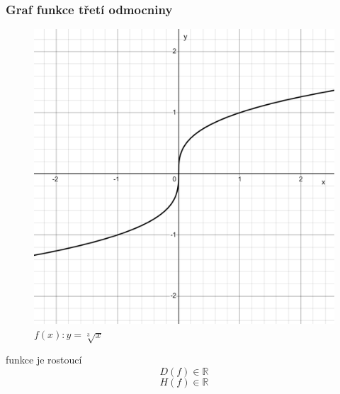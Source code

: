 \subsubsection{Graf funkce třetí odmocniny}
\begin{figure}[H]
        \centering
        \includegraphics[width=0.5\linewidth]{img/2_3odmocnina(x).png}
        \caption{$f(x): y=\sqrt[3]{x}$} 
        \label{fig:enter-label}
    \end{figure}
funkce je rostoucí
$$
    D(f)\in \mathbb{R} 
$$
$$
    H(f)\in \mathbb{R}
$$



